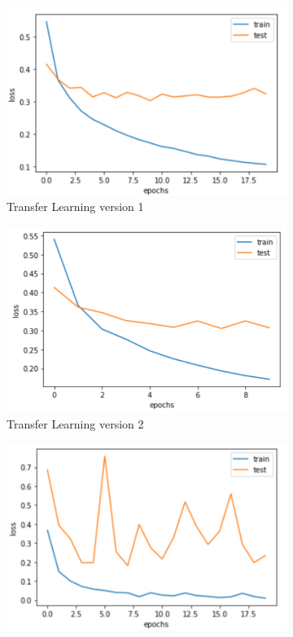 \begin{figure}[h]
  \centering
  \begin{subfigure}[b]{0.48\linewidth}
  \includegraphics[width=\linewidth]{figs/transfer_loss.png}
  \caption{Transfer Learning version 1}
  \label{fig:con_loss}
  \end{subfigure}
  \hfill
   \begin{subfigure}[b]{0.48\linewidth}
   \includegraphics[width=\linewidth]{figs/transfer_loss_2.png}
   \caption{Transfer Learning version 2}
   \label{fig:tri_loss}
  \end{subfigure}
    \hfill
    \begin{subfigure}[b]{0.48\linewidth}
   \includegraphics[width=\linewidth]{figs/transfer_loss_3.png}

\end{subfigure}
\end{figure}
